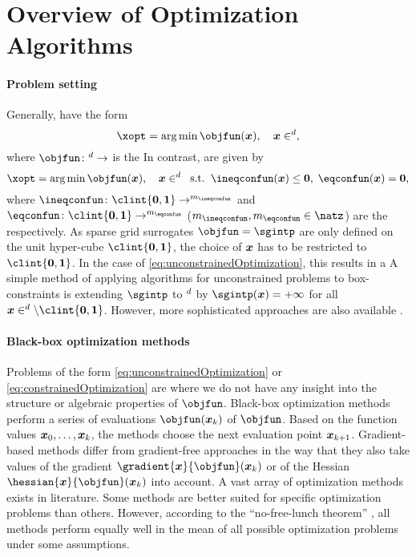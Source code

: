 \section{Overview of Optimization Algorithms}
\label{sec:51algorithms}

\paragraph{Problem setting}

Generally,  have the form
\begin{equation}
  \label{eq:unconstrainedOptimization}
  \xopt = \argmin \objfun(\*x),\quad
  \*x \in \real^d,
\end{equation}
where $\objfun\colon \real^d \to \real$ is the 
In contrast,  are given by
\begin{equation}
  \label{eq:constrainedOptimization}
  \xopt = \argmin \objfun(\*x),\quad
  \*x \in \real^d\;\;\text{s.t.}\;\;
  \ineqconfun(\*x) \le \*0,\;
  \eqconfun(\*x) = \*0,
\end{equation}
where
$\ineqconfun\colon \clint{\*0, \*1} \to \real^{m_{\ineqconfun}}$ and
$\eqconfun\colon \clint{\*0, \*1} \to \real^{m_{\eqconfun}}$
($m_{\ineqconfun}, m_{\eqconfun} \in \natz$)
are the  respectively.
As sparse grid surrogates $\objfun = \sgintp$ are only defined on the
unit hyper-cube $\clint{\*0, \*1}$,
the choice of ${\boldsymbol{x}}$ has to be restricted to $\clint{\*0, \*1}$.
In the case of \eqref{eq:unconstrainedOptimization},
this results in a 
A simple method of applying algorithms for unconstrained problems
to box-constraints is extending $\sgintp$ to $\real^d$ by
$\sgintp(\*x) = +\infty$ for all $\*x \in \real^d \setminus \clint{\*0, \*1}$.
However, more sophisticated
approaches are also available \cite{More87Optimization}.

\paragraph{Black-box optimization methods}

Problems of the form \eqref{eq:unconstrainedOptimization} or
\eqref{eq:constrainedOptimization} are 
where we do not have any insight into the structure or algebraic
properties of $\objfun$.
Black-box optimization methods perform a series of evaluations
$\objfun(\*x_k)$ of $\objfun$.
Based on the function values ${\boldsymbol{x}}_0, \dotsc, {\boldsymbol{x}}_k$,
the methods choose the next evaluation point ${\boldsymbol{x}}_{k+1}$.
Gradient-based methods differ from gradient-free approaches
in the way that they also take values of the gradient
$\gradient{\*x}{\objfun}(\*x_k)$ or of the Hessian
$\hessian{\*x}{\objfun}(\*x_k)$ into account.
A vast array of optimization methods exists in literature.
Some methods are better suited for specific optimization problems
than others.
However, according to the ``no-free-lunch theorem'' \cite{Wolpert97No},
all methods perform equally well in the mean of all possible
optimization problems under some assumptions.

